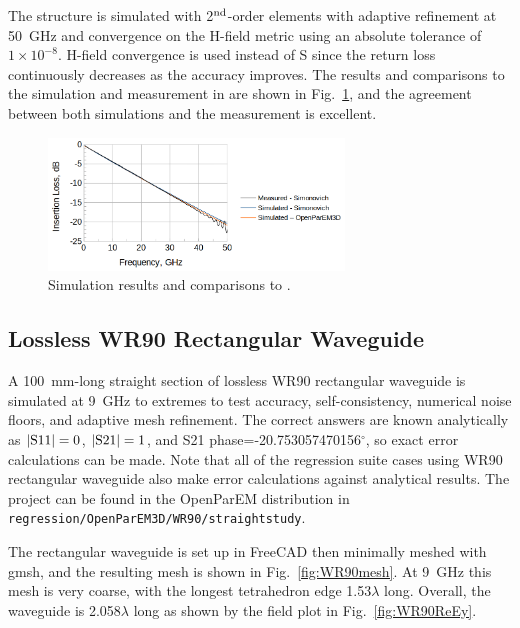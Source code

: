 \documentclass[titlepage]{article}
\renewcommand\_{\textunderscore\linebreak[1]}
\begin{document}
The structure is simulated with 2$^{\textnormal{nd}}$-order elements with adaptive refinement at 50~GHz and convergence on the H-field metric using an absolute tolerance of $1\!\!\times\!\!10^{-8}$.  H-field convergence is used instead of S since the return loss continuously decreases as the accuracy improves.  The results and comparisons to the simulation and measurement in \cite{Simonovich} are shown in Fig.~\ref{fig:stripline_results}, and the agreement between both simulations and the measurement is excellent.

\begin{figure}[H]
  \centering
  \includegraphics[width=0.7\textwidth]{../regression/OpenParEM3D/stripline/Simonovich_stripline_study/screenshots/stripline_results}
  \caption{Simulation results and comparisons to \cite{Simonovich}.}
  \label{fig:stripline_results}
\end{figure}

\subsection{Lossless WR90 Rectangular Waveguide}

A 100~mm-long straight section of lossless WR90 rectangular waveguide is simulated at 9~GHz to extremes to test accuracy, self-consistency, numerical noise floors, and adaptive mesh refinement.  The correct answers are known analytically as $|\textnormal{S11}|=0$, $|\textnormal{S21}|=1$, and S21 phase=-20.753057470156$^\circ$, so exact error calculations can be made.  Note that all of the regression suite cases using WR90 rectangular waveguide also make error calculations against analytical results.  The project can be found in the OpenParEM distribution in \texttt{regression/OpenParEM3D/WR90/straight\_study}.

The rectangular waveguide is set up in FreeCAD then minimally meshed with gmsh, and the resulting mesh is shown in Fig.~\ref{fig:WR90mesh}.  At 9~GHz this mesh is very coarse, with the longest tetrahedron edge 1.53$\lambda$ long.  Overall, the waveguide is 2.058$\lambda$ long as shown by the field plot in Fig.~\ref{fig:WR90ReEy}.
\end{document}
